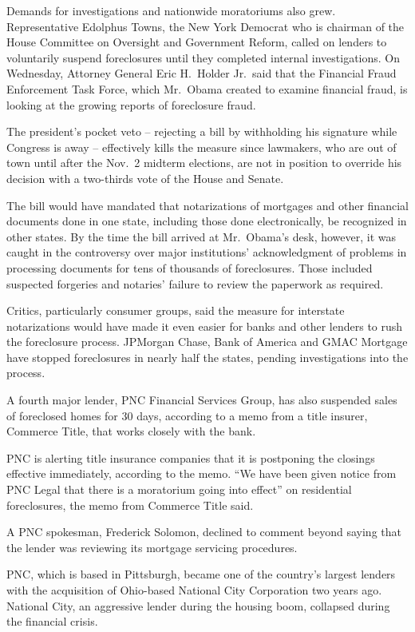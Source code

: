﻿\documentclass[12pt]{article}
\begin{document}
Demands for investigations and nationwide moratoriums also grew. Representative Edolphus Towns, the
New York Democrat who is chairman of the House Committee on Oversight and Government Reform, called
on lenders to voluntarily suspend foreclosures until they completed internal investigations. On
Wednesday, Attorney General Eric H.~Holder Jr.~said that the Financial Fraud Enforcement Task Force,
which Mr.~Obama created to examine financial fraud, is looking at the growing reports of foreclosure
fraud.

The president's pocket veto -- rejecting a bill by withholding his signature while Congress is away
-- effectively kills the measure since lawmakers, who are out of town until after the Nov.~2 midterm
elections, are not in position to override his decision with a two-thirds vote of the House and
Senate.

The bill would have mandated that notarizations of mortgages and other financial documents done in
one state, including those done electronically, be recognized in other states. By the time the bill
arrived at Mr.~Obama's desk, however, it was caught in the controversy over major institutions'
acknowledgment of problems in processing documents for tens of thousands of foreclosures. Those
included suspected forgeries and notaries' failure to review the paperwork as required.

Critics, particularly consumer groups, said the measure for interstate notarizations would have made
it even easier for banks and other lenders to rush the foreclosure process. JPMorgan Chase, Bank of
America and GMAC Mortgage have stopped foreclosures in nearly half the states, pending
investigations into the process.

A fourth major lender, PNC Financial Services Group, has also suspended sales of foreclosed homes
for 30 days, according to a memo from a title insurer, Commerce Title, that works closely with the
bank.

PNC is alerting title insurance companies that it is postponing the closings effective immediately,
according to the memo. ``We have been given notice from PNC Legal that there is a moratorium going
into effect'' on residential foreclosures, the memo from Commerce Title said.

A PNC spokesman, Frederick Solomon, declined to comment beyond saying that the lender was reviewing
its mortgage servicing procedures.

PNC, which is based in Pittsburgh, became one of the country's largest lenders with the acquisition
of Ohio-based National City Corporation two years ago. National City, an aggressive lender during
the housing boom, collapsed during the financial crisis.
\end{document}
